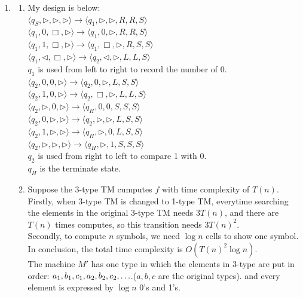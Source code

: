 \documentclass[12pt,a4paper]{article}
\makeatletter
\newtheorem*{solution}{Solution}
\theoremstyle{definition}
\renewenvironment{solution}[1][Solution] {\par\pushQED{\qed}\normalfont\topsep6\p@\@plus6\p@\relax\trivlist\item[\hskip\labelsep\bfseries#1\@addpunct{.}]\ignorespaces}{\popQED\endtrivlist\@endpefalse} \makeatother
\makeatother
\begin{document}
\begin{enumerate}
	\begin{solution}
		\begin{enumerate}
			\item My design is below:\\
			$\langle q_S, \triangleright, \triangleright, \triangleright \rangle \rightarrow \langle q_1, \triangleright,\triangleright,  R, R, S \rangle$\\
			$\langle q_1, 0, \Box, \triangleright \rangle \rightarrow \langle q_1, 0,\triangleright,  R, R, S \rangle$\\
			$\langle q_1, 1, \Box, \triangleright \rangle \rightarrow \langle q_1, \Box,\triangleright,  R, S, S \rangle$\\
			$\langle q_1, \triangleleft, \Box, \triangleright \rangle \rightarrow \langle q_2, \triangleleft,\triangleright,  L, L, S \rangle$\\
			$q_1$ is used from left to right to record the number of 0.\\
			$\langle q_2, 0, 0, \triangleright \rangle \rightarrow \langle q_2, 0,\triangleright,  L, S, S \rangle$\\
			$\langle q_2, 1, 0, \triangleright \rangle \rightarrow \langle q_2, \Box,\triangleright,  L, L, S \rangle$\\
			$\langle q_2, \triangleright, 0, \triangleright \rangle \rightarrow \langle q_H, 0,0,  S, S, S \rangle$\\
			$\langle q_2, 0, \triangleright, \triangleright \rangle \rightarrow \langle q_2, \triangleright,\triangleright,  L, S, S \rangle$\\
			$\langle q_2, 1, \triangleright, \triangleright \rangle \rightarrow \langle q_H, \triangleright, 0,  L, S, S \rangle$\\
			$\langle q_2, \triangleright, \triangleright, \triangleright \rangle \rightarrow \langle q_H, \triangleright,1,  S, S, S \rangle$\\
			$q_2$ is used from right to left to compare 1 with 0.\\
			$q_H$ is the terminate state.
			\item Suppose the 3-type TM cumputes $f$ with time complexity of $T(n)$. Firstly, when 3-type TM is changed to 1-type TM, everytime searching the elements in the original 3-type TM needs $3T(n)$, and there are $T(n)$ times computes, so this transition needs $3{T(n)}^2$.\\
			Secondly, to compute $n$ symbols, we need $\log n$ cells to show one symbol. In conclusion, the total time complexity is $O({T(n)}^2\log n)$.\\
			The machine $M'$ has one type in which the elements in 3-type are put in order: $a_1,b_1,c_1,a_2,\\b_2,c_2,\ldots$.($a,b,c$ are the original types). and every element is expressed by $\log n$ 0's and 1's.
		\end{enumerate}
	\end{solution} 
	

\end{enumerate}
\end{document}
